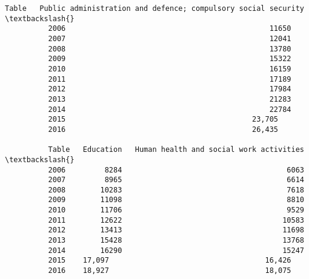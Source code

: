 \documentclass[11pt]{article}
\begin{document}
\begin{Verbatim}[commandchars=\\\{\}]
          Table   Public administration and defence; compulsory social security                                                      \textbackslash{}
          2006                                               11650                                                                    
          2007                                               12041                                                                    
          2008                                               13780                                                                    
          2009                                               15322                                                                    
          2010                                               16159                                                                    
          2011                                               17189                                                                    
          2012                                               17984                                                                    
          2013                                               21283                                                                    
          2014                                               22784                                                                    
          2015                                           23,705                                                                       
          2016                                           26,435                                                                       
          
          Table   Education   Human health and social work activities  \textbackslash{}
          2006         8284                                      6063   
          2007         8965                                      6614   
          2008        10283                                      7618   
          2009        11098                                      8810   
          2010        11706                                      9529   
          2011        12622                                     10583   
          2012        13413                                     11698   
          2013        15428                                     13768   
          2014        16290                                     15247   
          2015    17,097                                    16,426      
          2016    18,927                                    18,075      
          

\end{Verbatim}
\end{document}
